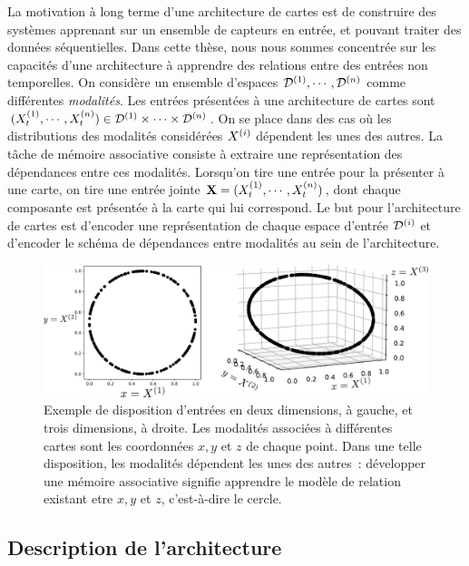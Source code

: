 \documentclass[../main]{subfiles}
\begin{document}
La motivation à long terme d'une architecture de cartes est de construire des systèmes apprenant sur un ensemble de capteurs en entrée, et pouvant traiter des données séquentielles.
Dans cette thèse, nous nous sommes concentrée sur les capacités d'une architecture à apprendre des relations entre des entrées non temporelles. 
On considère un ensemble d'espaces $\mathcal{D}^{({1})}, \cdots , \mathcal{D}^{({n})}$ comme différentes \emph{modalités}.
Les entrées présentées à une architecture de cartes sont $(X^{({1})}_t, \cdots, X^{({n})}_t) \in \mathcal{D}^{({1})} \times \cdots \times \mathcal{D}^{({n})}$. On se place dans des cas où les distributions des modalités considérées $X^{({i})}$ dépendent les unes des autres. 
La tâche de mémoire associative consiste à extraire une représentation des dépendances entre ces modalités. 
Lorsqu'on tire une entrée pour la présenter à une carte, on tire une entrée jointe $\mathbf{X} =  (X^{({1})}_t, \cdots , X^{({n})}_t)$, dont chaque composante est présentée à la carte qui lui correspond. 
Le but pour l'architecture de cartes est d'encoder une représentation de chaque espace d'entrée $\mathcal{D}^{({i})}$ et d'encoder le schéma de dépendances entre modalités au sein de l'architecture.

\begin{figure}
\centering
\includegraphics[width=\textwidth]{inputs_3som}
\caption{Exemple de disposition d'entrées en deux dimensions, à gauche, et trois dimensions, à droite. Les modalités associées à différentes cartes sont les coordonnées $x,y$ et $z$ de chaque point. Dans une telle disposition, les modalités dépendent les unes des autres~: développer une mémoire associative signifie apprendre le modèle de relation existant etre $x,y$ et $z$, c'est-à-dire le cercle.\label{fig:input_3som}}
\end{figure}

\subsection{Description de l'architecture}
\end{document}

